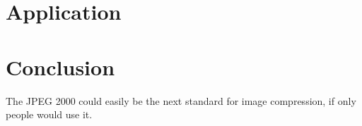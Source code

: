 \documentclass{article}
\begin{document}
\section{Application}


\section{Conclusion}

The JPEG 2000 could easily be the next standard for image compression, if only people would use it.


\printbibliography[]
\end{document}
